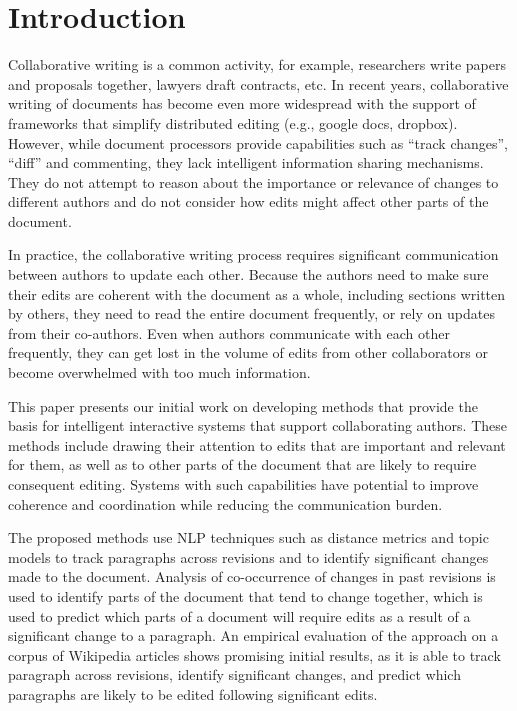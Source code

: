 \section{Introduction}\label{introduction}

Collaborative writing is a common activity, for example, researchers
write papers and proposals together, lawyers draft contracts, etc. In
recent years, collaborative writing of documents has become even more
widespread with the support of frameworks that simplify distributed
editing (e.g., google docs, dropbox). However, while document processors
provide capabilities such as ``track changes'', ``diff'' and commenting,
they lack intelligent information sharing mechanisms. They do not
attempt to reason about the importance or relevance of changes to
different authors and do not consider how edits might affect other parts
of the document.

In practice, the collaborative writing process requires significant
communication between authors to update each other. Because the authors
need to make sure their edits are coherent with the document as a whole,
including sections written by others, they need to read the entire
document frequently, or rely on updates from their co-authors. Even when
authors communicate with each other frequently, they can get lost in the
volume of edits from other collaborators or become overwhelmed with too
much information.

This paper presents our initial work on developing methods that provide
the basis for intelligent interactive systems that support collaborating
authors. These methods include drawing their attention to edits that are
important and relevant for them, as well as to other parts of the
document that are likely to require consequent editing. Systems with
such capabilities have potential to improve coherence and coordination
while reducing the communication burden.

The proposed methods use NLP techniques such as distance metrics and
topic models to track paragraphs across revisions and to identify
significant changes made to the document. Analysis of co-occurrence of
changes in past revisions is used to identify parts of the document that
tend to change together, which is used to predict which parts of a
document will require edits as a result of a significant change to a
paragraph. An empirical evaluation of the approach on a corpus of
Wikipedia articles shows promising initial results, as it is able to
track paragraph across revisions, identify significant changes, and
predict which paragraphs are likely to be edited following significant
edits.

